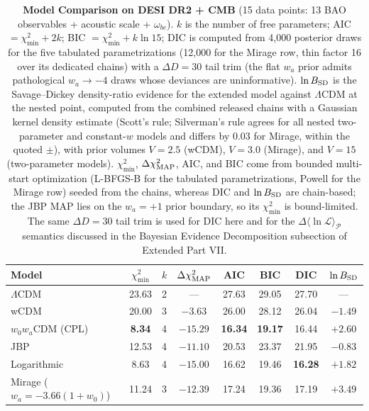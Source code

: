 \documentclass[aps,prd,preprint,superscriptaddress,nofootinbib]{revtex4-2}
\begin{document}
\begin{table}[!htbp]
    \centering
    \caption{\textbf{Model Comparison on DESI DR2 + CMB} (15 data points: 13 BAO observables + acoustic scale + $\omega_{bc}$). $k$ is the number of free parameters; AIC $= \chi^2_{\min} + 2k$; BIC $= \chi^2_{\min} + k\ln 15$; DIC is computed from 4{,}000 posterior draws for the five tabulated parametrizations (12{,}000 for the Mirage row, thin factor 16 over its dedicated chains) with a $\Delta D = 30$ tail trim (the flat $w_a$ prior admits pathological $w_a \to -4$ draws whose deviances are uninformative). $\ln B_{\rm SD}$ is the Savage--Dickey density-ratio evidence for the extended model against $\Lambda$CDM at the nested point, computed from the combined released chains with a Gaussian kernel density estimate (Scott's rule; Silverman's rule agrees for all nested two-parameter and constant-$w$ models and differs by 0.03 for Mirage, within the quoted $\pm$), with prior volumes $V = 2.5$ (wCDM), $V = 3.0$ (Mirage), and $V = 15$ (two-parameter models). $\chi^2_{\min}$, $\Delta\chi^2_{\rm MAP}$, AIC, and BIC come from bounded multi-start optimization (L-BFGS-B for the tabulated parametrizations, Powell for the Mirage row) seeded from the chains, whereas DIC and $\ln B_{\rm SD}$ are chain-based; the JBP MAP lies on the $w_a = +1$ prior boundary, so its $\chi^2_{\min}$ is bound-limited. The same $\Delta D = 30$ tail trim is used for DIC here and for the $\Delta\langle\ln\mathcal{L}\rangle_{\mathcal{P}}$ semantics discussed in the Bayesian Evidence Decomposition subsection of Extended Part VII.}
    \label{m:tab:modelcomp_verification}
    \begin{tabular}{lccccccc}
        \toprule
        Model & $\chi^2_{\min}$ & $k$ & $\Delta\chi^2_{\rm MAP}$ & AIC & BIC & DIC & $\ln B_{\rm SD}$ \\
        \midrule
        $\Lambda$CDM & 23.63 & 2 & --- & 27.63 & 29.05 & 27.70 & --- \\
        wCDM & 20.00 & 3 & $-3.63$ & 26.00 & 28.12 & 26.04 & $-1.49$ \\
        $w_0 w_a$CDM (CPL) & \textbf{8.34} & 4 & $\mathbf{-15.29}$ & \textbf{16.34} & \textbf{19.17} & 16.44 & $\mathbf{+2.60}$ \\
        JBP & 12.53 & 4 & $-11.10$ & 20.53 & 23.37 & 21.95 & $-0.83$ \\
        Logarithmic & 8.63 & 4 & $-15.00$ & 16.62 & 19.46 & \textbf{16.28} & $+1.82$ \\
        Mirage ($w_a = -3.66(1+w_0)$) & 11.24 & 3 & $-12.39$ & 17.24 & 19.36 & 17.19 & $\mathbf{+3.49}$ \\
        \bottomrule
    \end{tabular}
\end{table}
\end{document}
